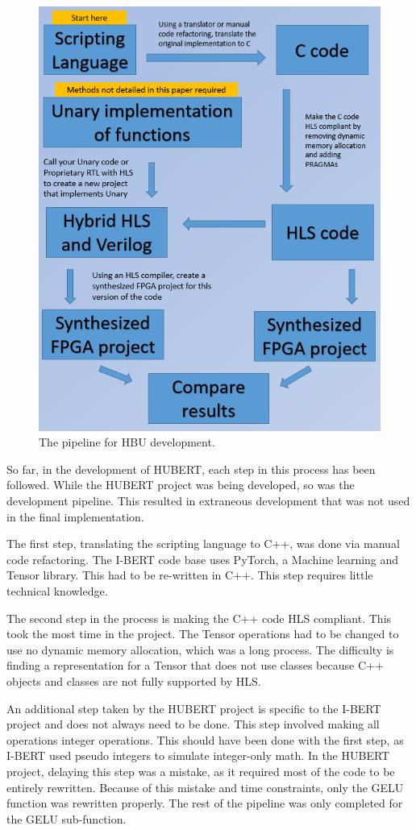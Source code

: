 \documentclass[12pt]{article}
\begin{document}
	\begin{figure}[h!]
		\centering
		\includegraphics[height=\linewidth]{figures/flow_chart.png}
		\caption{The pipeline for HBU development.}
		\label{fig:flowchart}
	\end{figure}

	So far, in the development of HUBERT, each step in this process has been followed. While the HUBERT project was being developed, so was the development pipeline. This resulted in extraneous development that was not used in the final implementation.
	
	The first step, translating the scripting language to C++, was done via manual code refactoring. The I-BERT code base uses PyTorch, a Machine learning and Tensor library. This had to be re-written in C++. This step requires little technical knowledge.
	
	The second step in the process is making the C++ code HLS compliant. This took the most time in the project. The Tensor operations had to be changed to use no dynamic memory allocation, which was a long process. The difficulty is finding a representation for a Tensor that does not use classes because C++ objects and classes are not fully supported by HLS.
	
	An additional step taken by the HUBERT project is specific to the I-BERT project and does not always need to be done. This step involved making all operations integer operations. This should have been done with the first step, as I-BERT used pseudo integers to simulate integer-only math. In the HUBERT project, delaying this step was a mistake, as it required most of the code to be entirely rewritten. Because of this mistake and time constraints, only the GELU function was rewritten properly. The rest of the pipeline was only completed for the GELU sub-function.
	
\end{document}
